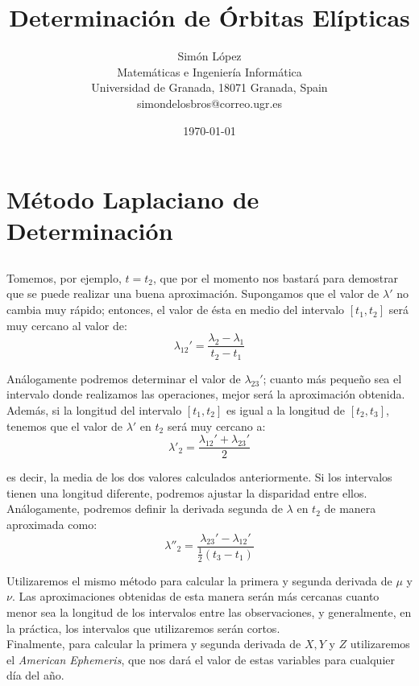 \documentclass[11pt]{article}
\title{Determinación de Órbitas Elípticas}
\author{Simón López
\\
{\small Matemáticas e Ingeniería Informática}
\\
{\small Universidad de Granada, 18071 Granada, Spain}
\\
{\small simondelosbros@correo.ugr.es}}
\date{\today}
\begin{document}
\section{Método Laplaciano de Determinación}

\subsection{}
\label{primera_segunda_derivada}

Tomemos, por ejemplo, $t=t_2$, que por el momento nos bastará para demostrar que se puede realizar una buena aproximación. Supongamos que el valor de $\lambda'$ no cambia muy rápido; entonces, el valor de ésta en medio del intervalo $[t_1,t_2]$ será muy cercano al valor de:
\[
\lambda_{12}'=\frac{\lambda_2-\lambda_1}{t_2-t_1}
\]

Análogamente podremos determinar el valor de $\lambda_{23}'$; cuanto más pequeño sea el intervalo donde realizamos las operaciones, mejor será la aproximación obtenida. Además, si la longitud del intervalo $[t_1,t_2]$ es igual a la longitud de $[t_2,t_3]$, tenemos que el valor de $\lambda'$ en $t_2$ será muy cercano a:
\[
\lambda'_2=\frac{\lambda_{12}'+\lambda_{23}'}{2}
\]

\noindent es decir, la media de los dos valores calculados anteriormente. Si los intervalos tienen una longitud diferente, podremos ajustar la disparidad entre ellos.\\

Análogamente, podremos definir la derivada segunda de $\lambda$ en $t_2$ de manera aproximada como:
\[
\lambda''_2=\frac{\lambda_{23}'-\lambda_{12}'}{\frac{1}{2}(t_3-t_1)}
\]

Utilizaremos el mismo método para calcular la primera y segunda derivada de $\mu$ y $\nu$. Las aproximaciones obtenidas de esta manera serán más cercanas cuanto menor sea la longitud de los intervalos entre las observaciones, y generalmente, en la práctica, los intervalos que utilizaremos serán cortos.\\

Finalmente, para calcular la primera y segunda derivada de $X, Y$ y $Z$ utilizaremos el \textit{American Ephemeris}, que nos dará el valor de estas variables para cualquier día del año.\\
\end{document}
